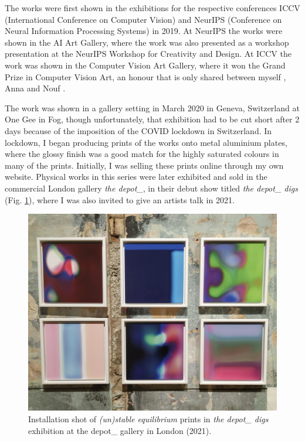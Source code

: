 The works were first shown in the exhibitions for the respective conferences ICCV (International Conference on Computer Vision) and NeurIPS (Conference on Neural Information Processing Systems) in 2019. 
At NeurIPS the works were shown in the AI Art Gallery, where the work was also presented as a workshop presentation at the NeurIPS Workshop for Creativity and Design. 
At ICCV the work was shown in the Computer Vision Art Gallery, where it won the Grand Prize in Computer Vision Art, an honour that is only shared between myself \citep{broad2019unstable}, Anna \citet{ridler2018mosaic} and Nouf \citet{aljowaysir2021salaf}.

The work was shown in a gallery setting in March 2020 in Geneva, Switzerland at One Gee in Fog, though unfortunately, that exhibition had to be cut short after 2 days because of the imposition of the COVID lockdown in Switzerland. 
In lockdown, I began producing prints of the works onto metal aluminium plates, where the glossy finish was a good match for the highly saturated colours in many of the prints. 
Initially, I was selling these prints online through my own website. Physical works in this series were later exhibited and sold in the commercial London gallery \textit{the depot\_}, in their debut show titled \textit{the depot\_ digs} \citep{depot2021digs}  (Fig. \ref{fig:c7:depot_digs}), where I was also invited to give an artists talk in 2021.

\begin{figure}[!htb]
    \centering
    \captionsetup{justification=centering}
    \includegraphics[width=1\textwidth]{figures/c7_impact/depot_cropped.png}
    \caption[Installation shot of \textit{(un)stable equilibrium} in the depot\_ gallery]{Installation shot of \textit{(un)stable equilibrium} prints in \textit{the depot\_ digs} exhibition at the depot\_ gallery in London (2021).}
    \label{fig:c7:depot_digs}
\end{figure}

